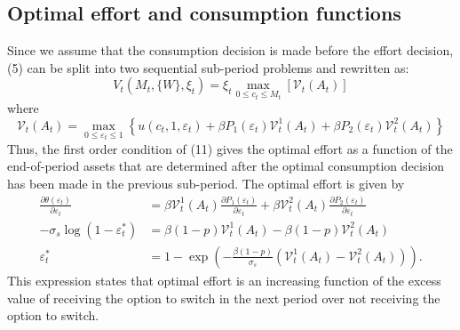 \documentclass[11pt]{article}
\newcommand{\eff}{\varepsilon}
\newcommand{\goth}[1]{\mathcal{#1}}   %
\begin{document}
\subsection{Optimal effort and consumption functions}
Since we assume that the consumption decision is made before the effort decision, (5)
can be split into two sequential sub-period problems and rewritten as:
\begin{equation}
V_t(M_t, \{W\}, \xi_t) = \xi_t \max_{0 \le c_t \le M_t} \left[ \goth{V}_t(A_t) \right]
\end{equation}
where
\begin{equation}
\goth{V}_t(A_t) = \max_{0 \le \eff_t \le 1}
\left\{ u(c_t, 1, \eff_t) + \beta P_1(\eff_t) \goth{V}_t^1(A_t) + \beta P_2(\eff_t) \goth{V}_t^2(A_t) \right\}
\end{equation}
Thus, the first order condition of (11) gives the optimal effort as a function of the
end-of-period assets that are determined after the optimal consumption decision has
been made in the previous sub-period. The optimal effort is given by
\begin{align}
\frac{\partial \theta(\eff_t)}{\partial \eff_t}
&= \beta \goth{V}_t^1(A_t) \frac{\partial P_1(\eff_t)}{\partial \eff_t}
+ \beta \goth{V}_t^2(A_t) \frac{\partial P_2(\eff_t)}{\partial \eff_t} \\
-\sigma_s \log(1 - \eff_t^*)
&= \beta (1 - p) \goth{V}_t^1(A_t) - \beta (1 - p) \goth{V}_t^2(A_t) \\
\eff_t^* &= 1 - \exp\left( -\frac{\beta (1 - p)}{\sigma_s}
\left( \goth{V}_t^1(A_t) - \goth{V}_t^2(A_t) \right) \right).
\end{align}
This expression states that optimal effort is an increasing function of the excess value
of receiving the option to switch in the next period over not receiving the option to
switch.
\end{document}
